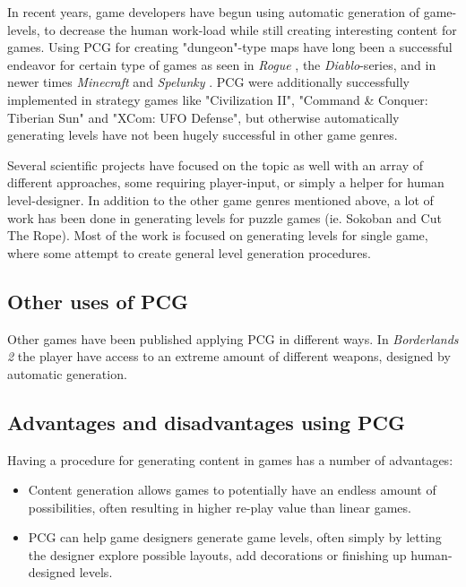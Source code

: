 \documentclass[a4paper,titlepage,final, twoside]{report}
\begin{document}
In recent years, game developers have begun using automatic generation of game-levels, to decrease the human work-load while still creating interesting content for games. Using PCG for creating "dungeon"-type maps have long been a successful endeavor for certain type of games as seen in \textit{Rogue} \citeyearpar{game:rogue}, the \textit{Diablo}-series, and in newer times \textit{Minecraft} \citeyearpar{game:minecraft} and \textit{Spelunky} \citeyearpar{game:spelunky}. PCG were additionally successfully implemented in strategy games like "Civilization II", "Command \& Conquer: Tiberian Sun" and "XCom: UFO Defense", but otherwise automatically generating levels have not been hugely successful in other game genres.

Several scientific projects have focused on the topic as well with an array of different approaches, some requiring player-input, or simply a helper for human level-designer. In addition to the other game genres mentioned above, a lot of work has been done in generating levels for puzzle games (ie. Sokoban and Cut The Rope).
Most of the work is focused on generating levels for single game, where some attempt to create general level generation procedures.


\subsection{Other uses of PCG}
Other games have been published applying PCG in different ways. In \textit{Borderlands 2} \citeyearpar{game:borderlands} the player have access to an extreme amount of different weapons, designed by automatic generation.


\subsection{Advantages and disadvantages using PCG}

Having a procedure for generating content in games has a number of advantages:

\begin{itemize}
  \item Content generation allows games to potentially have an endless amount of possibilities, often resulting in higher re-play value than linear games. 
  \item PCG can help game designers generate game levels, often simply by letting the designer explore possible layouts, add decorations or finishing up human-designed levels.
\end{itemize}
\end{document}
